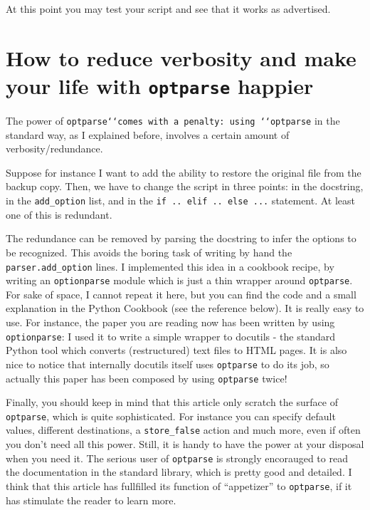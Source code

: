 \documentclass[10pt,a4paper,english]{article}
\begin{document}
At this point you may test your script and see that it works as
advertised.



\hypertarget{how-to-reduce-verbosity-and-make-your-life-with-optparse-happier}{}
\section*{How to reduce verbosity and make your life with \texttt{optparse} happier}

The power of \texttt{optparse`{}`comes with a penalty: using `{}`optparse} in
the standard way, as I explained before, involves a certain amount of 
verbosity/redundance.

Suppose for instance 
I want to add the ability to restore the original file from the backup copy.
Then, we have to change the script in three points: in the docstring,
in the \texttt{add{\_}option} list, and in the \texttt{if .. elif .. else ...} 
statement. At least one of this is redundant.

The redundance can be removed by parsing the docstring to infer the 
options to be recognized. This avoids the boring task 
of writing by hand the \texttt{parser.add{\_}option} lines. 
I implemented this idea in a cookbook recipe, by writing an 
\texttt{optionparse} module which is just a thin wrapper around \texttt{optparse}.
For sake of space, I cannot repeat it here, but you can find the code
and a small explanation in the Python Cookbook (see the reference below).
It is really easy to use. For instance, the paper you are 
reading now has been written by using \texttt{optionparse}: I used it to 
write a simple wrapper to docutils - the standard
Python tool which converts (restructured) text files to HTML pages. 
It is also nice to notice that internally
docutils itself uses \texttt{optparse} to do its job, so actually this
paper has been composed by using \texttt{optparse} twice!

Finally, you should keep in mind that this article only scratch the
surface of \texttt{optparse}, which is quite sophisticated. 
For instance you can specify default values, different destinations, 
a \texttt{store{\_}false} action and much more, even if often you don't need 
all this power. Still, it is handy to have the power at your disposal when 
you need it.  The serious user of \texttt{optparse} is strongly 
encorauged to read the documentation in the standard library, which 
is pretty good and detailed. I think that this article has fullfilled
its function of ``appetizer'' to \texttt{optparse}, if it has stimulate 
the reader to learn more.
\end{document}
